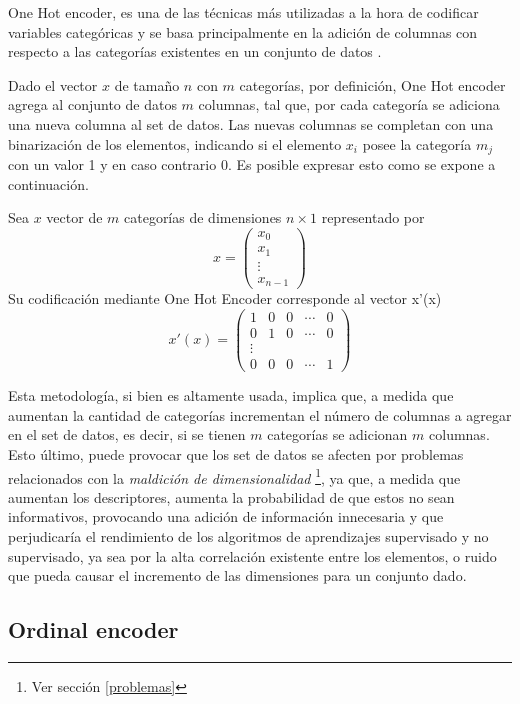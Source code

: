 One Hot encoder, es una de las técnicas más utilizadas a la hora de codificar variables categóricas y se basa principalmente en la adición de columnas con respecto a las categorías existentes en un conjunto de datos \cite{brownlee2017one}.

Dado el vector  $x$ de tamaño $n$ con $m$ categorías, por definición, One Hot encoder agrega al conjunto de datos $m$ columnas, tal que, por cada categoría se adiciona una nueva columna al set de datos. Las nuevas columnas se completan con una binarización de los elementos, indicando si el elemento $x_{i}$ posee la categoría $m_{j}$ con un valor 1 y en caso contrario 0. Es posible expresar esto como se expone a continuación.

Sea $x$ vector de $m$ categorías de dimensiones
$n \times 1$ representado por
\[ x = \left( \begin{array}{ccc}
x_{0}\\
x_{1}\\
\vdots\\
x_{n-1} \end{array} \right)\] 
Su codificación mediante One Hot Encoder corresponde al vector x'(x)
\[ x'(x) = \left( \begin{array}{ccccc}
1 & 0 & 0 & \cdots & 0 \\
0 & 1 & 0 & \cdots & 0 \\
\vdots\\
0 & 0 & 0 & \cdots & 1 \end{array} \right) \] 

Esta metodología, si bien es altamente usada, implica que, a medida que aumentan la cantidad de categorías incrementan el número de columnas a agregar en el set de datos, es decir, si se tienen $m$ categorías se adicionan $m$ columnas. Esto último, puede provocar que los set de datos se afecten por problemas relacionados con la \textit{maldición de dimensionalidad} \footnote{Ver sección \ref{problemas}}, ya que, a medida que aumentan los descriptores, aumenta la probabilidad de que estos no sean informativos, provocando una adición de información innecesaria y que perjudicaría el rendimiento de los algoritmos de aprendizajes supervisado y no supervisado, ya sea por la alta correlación existente entre los elementos, o ruido que pueda causar el incremento de las dimensiones para un conjunto dado.

\subsection{Ordinal encoder}

